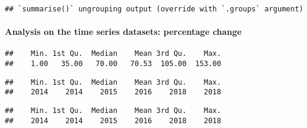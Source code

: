 \documentclass[
]{article}
\newenvironment{Shaded}{\begin{snugshade}}{\end{snugshade}}
\newcommand{\DataTypeTok}[1]{\textcolor[rgb]{0.13,0.29,0.53}{#1}}
\newcommand{\KeywordTok}[1]{\textcolor[rgb]{0.13,0.29,0.53}{\textbf{#1}}}
\newcommand{\NormalTok}[1]{#1}
\newcommand{\OperatorTok}[1]{\textcolor[rgb]{0.81,0.36,0.00}{\textbf{#1}}}
\newcommand{\StringTok}[1]{\textcolor[rgb]{0.31,0.60,0.02}{#1}}
\begin{document}
\begin{verbatim}
## `summarise()` ungrouping output (override with `.groups` argument)
\end{verbatim}

\hypertarget{analysis-on-the-time-series-datasets-percentage-change}{%
\paragraph{Analysis on the time series datasets: percentage
change}\label{analysis-on-the-time-series-datasets-percentage-change}}

\begin{Shaded}
\end{Shaded}

\begin{verbatim}
##    Min. 1st Qu.  Median    Mean 3rd Qu.    Max. 
##    1.00   35.00   70.00   70.53  105.00  153.00
\end{verbatim}

\begin{Shaded}
\end{Shaded}

\begin{verbatim}
##    Min. 1st Qu.  Median    Mean 3rd Qu.    Max. 
##    2014    2014    2015    2016    2018    2018
\end{verbatim}

\begin{Shaded}
\end{Shaded}

\begin{verbatim}
##    Min. 1st Qu.  Median    Mean 3rd Qu.    Max. 
##    2014    2014    2015    2016    2018    2018
\end{verbatim}
\end{document}

